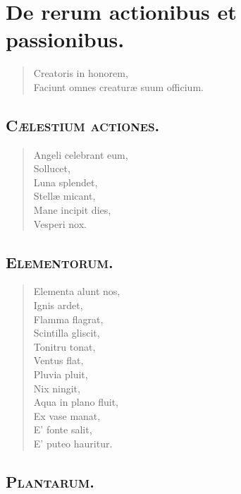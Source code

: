\chapter{De rerum actionibus et passionibus.}


\begin{verse}

  Creatoris in honorem,\\
  Faciunt omnes creaturæ suum officium.\\
\end{verse}

\section*{\textsc{Cælestium actiones.}}


\begin{verse}

  Angeli celebrant eum,\\
  Sollucet,\\
  Luna splendet,\\
  Stellæ micant,\\
  Mane incipit dies,\\
  Vesperi nox.\\
\end{verse}



\section*{\textsc{Elementorum.}}


\begin{verse}

  Elementa alunt nos,\\
  Ignis ardet,\\
  Flamma flagrat,\\
  Scintilla gliscit,\\
  Tonitru tonat,\\
  Ventus flat,\\
  Pluvia pluit,\\
  Nix ningit,\\
  Aqua in plano fluit,\\
  Ex vase manat,\\
  E' fonte salit,\\
  E' puteo hauritur.\\
\end{verse}

\section*{\textsc{Plantarum.}}


